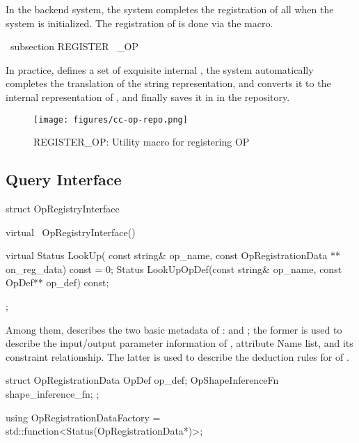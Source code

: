 \begin{content}

In the \cpp{} backend system, the system completes the registration of all  when the system is initialized. The registration of  is done via the  macro.

\ subsection {REGISTER \ _OP}

In practice,  defines a set of exquisite internal , the system automatically completes the translation of the string representation, and converts it to the internal representation of , and finally saves it in  in the repository.

\begin{figure}[!h]
\centering
\texttt{[image: figures/cc-op-repo.png]}
\caption{REGISTER\_OP: Utility macro for registering OP}
 \label{fig:cc-op-repo}
\end{figure}

\subsection{Query Interface}

\begin{leftbar}
\begin{c++}
struct OpRegistryInterface {
  virtual ~OpRegistryInterface() {}

  virtual Status LookUp(
    const string& op_name,
    const OpRegistrationData ** on_reg_data) const = 0;
  Status LookUpOpDef(const string& op_name, const OpDef** op_def) const;
};
\end{c++}
\end{leftbar}

Among them,  describes the two basic metadata of :  and ; the former is used to describe the input/output parameter information of , attribute Name list, and its constraint relationship. The latter is used to describe the deduction rules for  of .

\begin{leftbar}
\begin{c++}
struct OpRegistrationData {
  OpDef op_def;
  OpShapeInferenceFn shape_inference_fn;
};

using OpRegistrationDataFactory = 
  std::function<Status(OpRegistrationData*)>;
\end{c++}
\end{leftbar}


\end{content}
